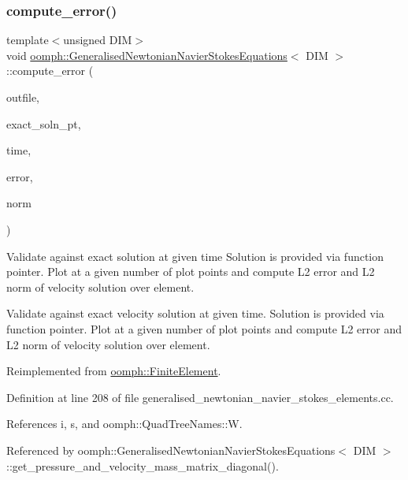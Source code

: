 \subsubsection{\texorpdfstring{compute\+\_\+error()}{compute\_error()}\hspace{0.1cm}{\footnotesize\ttfamily [1/2]}}
{\footnotesize\ttfamily template$<$unsigned D\+IM$>$ \\
void \hyperlink{classoomph_1_1GeneralisedNewtonianNavierStokesEquations}{oomph\+::\+Generalised\+Newtonian\+Navier\+Stokes\+Equations}$<$ D\+IM $>$\+::compute\+\_\+error (\begin{DoxyParamCaption}\item[{std\+::ostream \&}]{outfile,  }\item[{\hyperlink{classoomph_1_1FiniteElement_ad4ecf2b61b158a4b4d351a60d23c633e}{Finite\+Element\+::\+Unsteady\+Exact\+Solution\+Fct\+Pt}}]{exact\+\_\+soln\+\_\+pt,  }\item[{const double \&}]{time,  }\item[{double \&}]{error,  }\item[{double \&}]{norm }\end{DoxyParamCaption})\hspace{0.3cm}{\ttfamily [virtual]}}



Validate against exact solution at given time Solution is provided via function pointer. Plot at a given number of plot points and compute L2 error and L2 norm of velocity solution over element. 

Validate against exact velocity solution at given time. Solution is provided via function pointer. Plot at a given number of plot points and compute L2 error and L2 norm of velocity solution over element. 

Reimplemented from \hyperlink{classoomph_1_1FiniteElement_a7f67853506dc73fa6b7505108de22d1f}{oomph\+::\+Finite\+Element}.



Definition at line 208 of file generalised\+\_\+newtonian\+\_\+navier\+\_\+stokes\+\_\+elements.\+cc.



References i, s, and oomph\+::\+Quad\+Tree\+Names\+::W.



Referenced by oomph\+::\+Generalised\+Newtonian\+Navier\+Stokes\+Equations$<$ D\+I\+M $>$\+::get\+\_\+pressure\+\_\+and\+\_\+velocity\+\_\+mass\+\_\+matrix\+\_\+diagonal().

\mbox{\label{classoomph_1_1GeneralisedNewtonianNavierStokesEquations_af8aac75c7792345dbdd9ca02de0bee0b}} 
